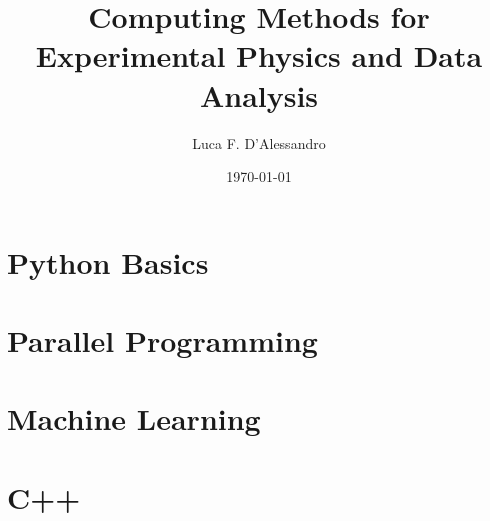 \documentclass[10pt, a4paper, twosided, openright, titlepage, draft]{book}
\title{Computing Methods for Experimental Physics and Data Analysis}
\author{Luca F. D'Alessandro}
\date{\today}
\begin{document}
\chapter{Python Basics}



\chapter{Parallel Programming}



\chapter{Machine Learning}



\chapter{C++}
\end{document}
